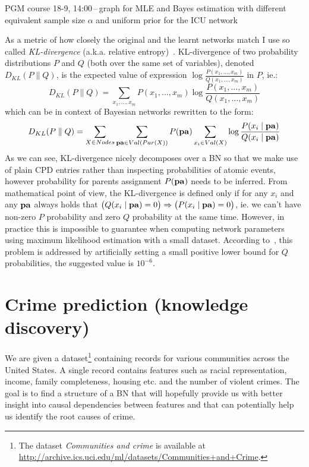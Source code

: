 \documentclass[english,cover]{fitthesis} %
\newcommand{\term}[1]{\emph{#1}}           %
\newcommand{\vars}[1]{{\bold{#1}}}         %
\newcommand{\todo}[1]{{\color{red}#1}}
\begin{document}
\todo{PGM course 18-9, 14:00\,--\,graph for MLE and Bayes estimation with different equivalent sample size $\alpha$ and uniform prior for the ICU network}

As a metric of how closely the original and the learnt networks match I use so called \term{KL-divergence} (a.k.a. relative entropy)~\cite{pgm}. KL-divergence of two probability distributions $P$ and $Q$ (both over the same set of variables), denoted $D_{KL}(P \parallel Q)$, is the expected value of expression $\log \frac{P(x_1,\dots,x_m)}{Q(x_1,\dots,x_m)}$ in $P$, ie.:
\begin{equation*}
D_{KL}(P \parallel Q) = \sum_{x_1,\dots,x_m} P(x_1,\dots,x_m) \log \frac{P(x_1,\dots,x_m)}{Q(x_1,\dots,x_m)}
\end{equation*}
which can be in context of Bayesian networks rewritten to the form:
\begin{equation*}
D_{KL}(P \parallel Q) = \sum_{X \in Nodes} \sum_{\vars{pa} \in Val(Par(X))} P(\vars{pa}) \sum_{x_i \in Val(X)} \log \frac{P(x_i \mid \vars{pa})}{Q(x_i \mid \vars{pa})}
\end{equation*}
As we can see, KL-divergence nicely decomposes over a BN so that we make use of plain CPD entries rather than inspecting probabilities of atomic events, however probability for parents assignment $P(\vars{pa})$ needs to be inferred. %
From mathematical point of view, the KL-divergence is defined only if for any $x_i$ and any $\vars{pa}$ always holds that $\bigl( Q(x_i \mid \vars{pa}) = 0 \bigr) \Rightarrow \bigl( P(x_i \mid \vars{pa}) = 0 \bigr)$, ie. we can't have non-zero $P$ probability and zero $Q$ probability at the same time. However, in practice this is impossible to guarantee when computing network parameters using maximum likelihood estimation with a small dataset. According to~\cite{kl_divergence_wifi,kl_divergence_noisy_max}, this problem is addressed by artificially setting a small positive lower bound for $Q$ probabilities, the suggested value is $10^{-6}$.



\section{Crime prediction (knowledge discovery)}
We are given a dataset\footnote{The dataset \emph{Communities and crime} is available at \url{http://archive.ics.uci.edu/ml/datasets/Communities+and+Crime}.} containing records for various communities across the United States. A single record contains features such as racial representation, income, family completeness, housing etc. and the number of violent crimes. The goal is to find a structure of a BN that will hopefully provide us with better insight into causal dependencies between features and that can potentially help us identify the root causes of crime.
\end{document}
